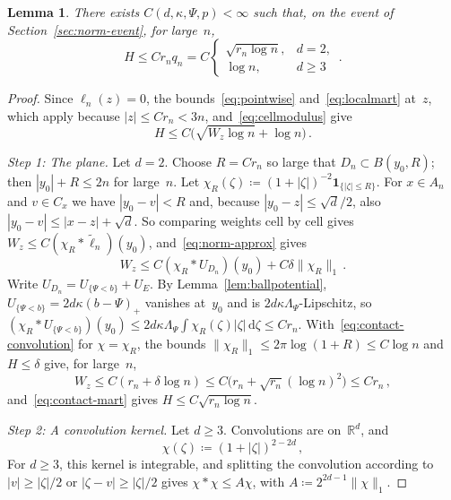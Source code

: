 \documentclass[11pt]{amsart}
\theoremstyle{plain}
\newtheorem{lemma}[theorem]{Lemma}
\theoremstyle{definition}
\newcommand{\R}{\mathbb R}
\newcommand{\drift}{\kappa}
\newcommand{\gauge}{\Psi}
\newcommand{\ind}{\mathbf 1}
\newcommand{\dd}{\,\mathrm d}
\numberwithin{equation}{section}
\begin{document}
\begin{lemma}\label{lem:contact}
There exists $C(d,\drift,\gauge,p)<\infty$ such that, on the event of Section~\ref{sec:norm-event}, for large~$n$,
\begin{equation*}
H\leq Cr_nq_n=C\begin{cases}\sqrt{r_n\log n},&d=2,\\\log n,&d\geq3\end{cases}\, .
\end{equation*}
\end{lemma}

\begin{proof}
Since $\ell_n(z)=0$, the bounds~\eqref{eq:pointwise} and~\eqref{eq:localmart} at~$z$, which apply because $|z|\leq Cr_n<3n$, and~\eqref{eq:cellmodulus} give
\begin{equation}\label{eq:contact-mart}
H\leq C\bigl(\sqrt{W_z\log n}+\log n\bigr)\, .
\end{equation}

\emph{Step 1: The plane.} Let $d=2$. Choose $R=Cr_n$ so large that $D_n\subset B(y_0,R)$; then $|y_0|+R\leq2n$ for large~$n$. Let $\chi_R(\zeta)\coloneqq(1+|\zeta|)^{-2}\ind_{\{|\zeta|\leq R\}}$. For $x\in A_n$ and $v\in C_x$ we have $|y_0-v|<R$ and, because $|y_0-z|\leq\sqrt d/2$, also $|y_0-v|\leq|x-z|+\sqrt d$. So comparing weights cell by cell gives $W_z\leq C(\chi_R*\widetilde\ell_n)(y_0)$, and~\eqref{eq:norm-approx} gives
\begin{equation*}
W_z\leq C(\chi_R*U_{D_n})(y_0)+C\delta\|\chi_R\|_1\, .
\end{equation*}
Write $U_{D_n}=U_{\{\gauge<b\}}+U_E$. By Lemma~\ref{lem:ballpotential}, $U_{\{\gauge<b\}}=2d\drift(b-\gauge)_+$ vanishes at~$y_0$ and is $2d\drift\Lambda_\gauge$-Lipschitz, so $(\chi_R*U_{\{\gauge<b\}})(y_0)\leq2d\drift\Lambda_\gauge\int\chi_R(\zeta)|\zeta|\dd\zeta\leq Cr_n$. With~\eqref{eq:contact-convolution} for $\chi=\chi_R$, the bounds $\|\chi_R\|_1\leq2\pi\log(1+R)\leq C\log n$ and $H\leq\delta$ give, for large~$n$,
\begin{equation*}
W_z\leq C(r_n+\delta\log n)\leq C\bigl(r_n+\sqrt{r_n}(\log n)^2\bigr)\leq Cr_n\, ,
\end{equation*}
and~\eqref{eq:contact-mart} gives $H\leq C\sqrt{r_n\log n}$.

\emph{Step 2: A convolution kernel.} Let $d\geq3$. Convolutions are on~$\R^d$, and
\begin{equation*}
\chi(\zeta)\coloneqq(1+|\zeta|)^{2-2d}\, ,
\end{equation*}
For $d\geq3$, this kernel is integrable, and splitting the convolution according to $|v|\geq|\zeta|/2$ or $|\zeta-v|\geq|\zeta|/2$ gives $\chi*\chi\leq A\chi$, with $A\coloneqq2^{2d-1}\|\chi\|_1$.


\end{proof}
\end{document}
